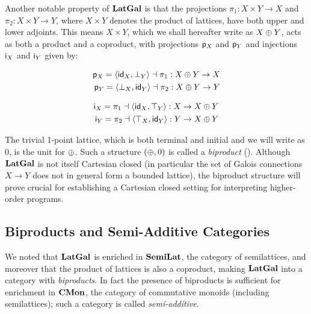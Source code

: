 Another notable property of $\mathbf{LatGal}$ is that the projections $\pi_1: X \times Y \to X$ and $\pi_2: X \times Y
\to Y$, where $X \times Y$ denotes the product of lattices, have both upper and lower adjoints. This means $X
\times Y$, which we shall hereafter write as $X \oplus Y$, acts as both a product and a coproduct, with
projections $\mathsf{p}_X$ and $\mathsf{p}_Y$ and injections $\mathsf{i}_X$ and $\mathsf{i}_Y$ given by:

\vspace{-4mm}
\begin{minipage}[t]{0.45\textwidth}
\begin{center}
\begin{align*}
   \mathsf{p}_X = \langle \mathsf{id}_X, \bot_Y\rangle \dashv \pi_1: X \oplus Y \to X \\
   \mathsf{p}_Y = \langle \bot_X, \mathsf{id}_Y\rangle \dashv \pi_2: X \oplus Y \to Y
\end{align*}
\end{center}
\end{minipage}%
\begin{minipage}[t]{0.45\textwidth}
\begin{center}
\begin{align*}
   \mathsf{i}_X = \pi_1 \dashv \langle \mathsf{id}_X, \top_Y\rangle : X \to X \oplus Y \\
   \mathsf{i}_Y = \pi_2 \dashv \langle \top_X, \mathsf{id}_Y\rangle: Y \to X \oplus Y
\end{align*}
\end{center}
\end{minipage}
\vspace{2mm}

\noindent The trivial 1-point lattice, which is both terminal and initial and we will write as $0$, is the
unit for $\oplus$. Such a structure $(\oplus, 0)$ is called a \emph{biproduct} ().
Although $\mathbf{LatGal}$ is not itself Cartesian closed (in particular the set of Galois connections $X \to Y$ does
not in general form a bounded lattice), the biproduct structure will prove crucial for establishing a
Cartesian closed setting for interpreting higher-order programs.

\subsection{Biproducts and Semi-Additive Categories}
\label{sec:biproducts}

We noted that $\mathbf{LatGal}$ is enriched in $\mathbf{SemiLat}$, the category of semilattices, and moreover that the product
of lattices is also a coproduct, making $\mathbf{LatGal}$ into a category with \emph{biproducts}. In fact the presence
of biproducts is sufficient for enrichment in $\mathbf{CMon}$, the category of commutative monoids (including
semilattices); such a category is called \emph{semi-additive}.

